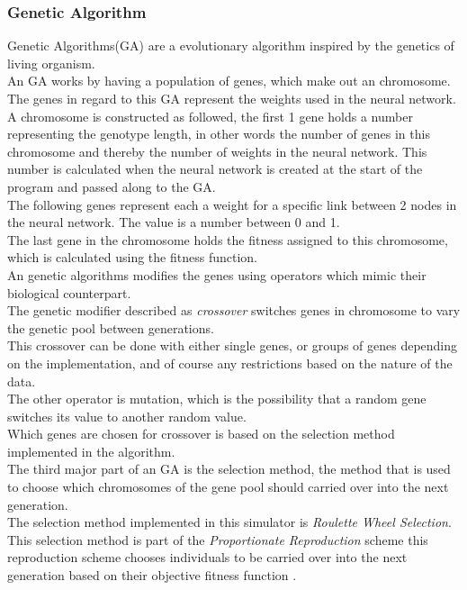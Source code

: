 \subsubsection{Genetic Algorithm}
Genetic Algorithms(GA) are a evolutionary algorithm inspired by the genetics of living organism. \\
An GA works by having a population  of genes, which make out an chromosome. The genes in regard to this GA represent the weights used in the neural network. \\
A chromosome is constructed as followed, the first 1 gene holds a number representing the genotype length, in other words the number of genes in this chromosome and thereby the number of weights in the neural network. This number is calculated when the neural network is created at the start of the program and passed along to the GA.\\
The following genes represent each a weight for a specific link between 2 nodes in the neural network. The value is a number between 0 and 1. \\
The last gene in the chromosome holds the fitness assigned to this chromosome, which is calculated using the fitness function.\\

An genetic algorithms modifies the genes using operators which mimic their biological counterpart. \\

The genetic modifier described as \textit{crossover} switches genes in chromosome to vary the genetic pool between generations. \\
This crossover can be done with either single genes, or groups of genes depending on the implementation, and of course any restrictions based on the nature of the data. \\

The other operator is mutation, which is the possibility that a random gene switches its value to another random value.\\
Which genes are chosen for crossover is based on the selection method implemented in the algorithm. \\
The third major part of an GA is the selection method, the method that is used to choose which chromosomes of the gene pool should carried over into the next generation.\\
The selection method implemented in this simulator is \textit{Roulette Wheel Selection}. 
This selection method is part of the \textit{Proportionate Reproduction} scheme this reproduction scheme chooses individuals to be carried over into the next generation based on their objective fitness function \cite{goldberg1991comparative}. 

